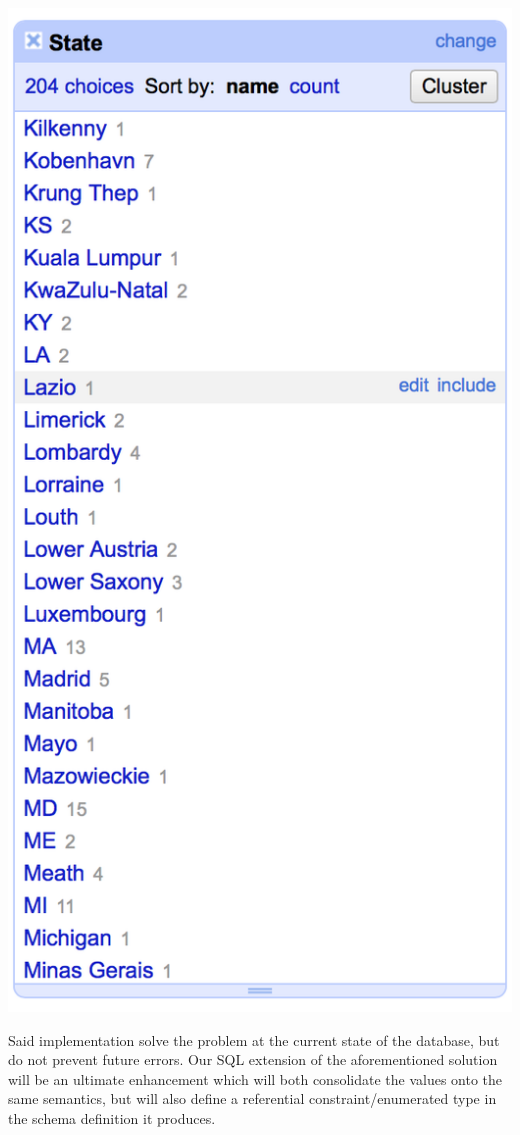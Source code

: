 \documentclass{../sty/acm_proc_article-sp}
\begin{document}
\begin{description}
\includegraphics[scale=.5]{../img/refine}

Said implementation solve the problem at the current state of the database, but do not prevent future errors. Our SQL extension of the aforementioned solution will be an ultimate enhancement which will both consolidate the values onto the same semantics, but will also define a referential constraint/enumerated type in the schema definition it produces.



\end{description}
\end{document}
